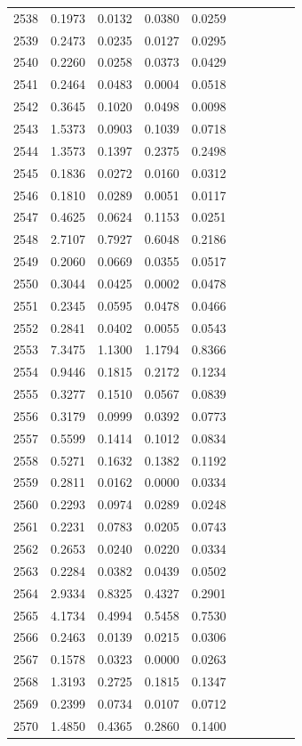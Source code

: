 \begin{table}
\begin{tabular}{cccccccccc}
2538& 0.1973& 0.0132& 0.0380& 0.0259\\ 
2539& 0.2473& 0.0235& 0.0127& 0.0295\\ 
2540& 0.2260& 0.0258& 0.0373& 0.0429\\ 
2541& 0.2464& 0.0483& 0.0004& 0.0518\\ 
2542& 0.3645& 0.1020& 0.0498& 0.0098\\ 
2543& 1.5373& 0.0903& 0.1039& 0.0718\\ 
2544& 1.3573& 0.1397& 0.2375& 0.2498\\ 
2545& 0.1836& 0.0272& 0.0160& 0.0312\\ 
2546& 0.1810& 0.0289& 0.0051& 0.0117\\ 
2547& 0.4625& 0.0624& 0.1153& 0.0251\\ 
2548& 2.7107& 0.7927& 0.6048& 0.2186\\ 
2549& 0.2060& 0.0669& 0.0355& 0.0517\\ 
2550& 0.3044& 0.0425& 0.0002& 0.0478\\ 
2551& 0.2345& 0.0595& 0.0478& 0.0466\\ 
2552& 0.2841& 0.0402& 0.0055& 0.0543\\ 
2553& 7.3475& 1.1300& 1.1794& 0.8366\\ 
2554& 0.9446& 0.1815& 0.2172& 0.1234\\ 
2555& 0.3277& 0.1510& 0.0567& 0.0839\\ 
2556& 0.3179& 0.0999& 0.0392& 0.0773\\ 
2557& 0.5599& 0.1414& 0.1012& 0.0834\\ 
2558& 0.5271& 0.1632& 0.1382& 0.1192\\ 
2559& 0.2811& 0.0162& 0.0000& 0.0334\\ 
2560& 0.2293& 0.0974& 0.0289& 0.0248\\ 
2561& 0.2231& 0.0783& 0.0205& 0.0743\\ 
2562& 0.2653& 0.0240& 0.0220& 0.0334\\ 
2563& 0.2284& 0.0382& 0.0439& 0.0502\\ 
2564& 2.9334& 0.8325& 0.4327& 0.2901\\ 
2565& 4.1734& 0.4994& 0.5458& 0.7530\\ 
2566& 0.2463& 0.0139& 0.0215& 0.0306\\ 
2567& 0.1578& 0.0323& 0.0000& 0.0263\\ 
2568& 1.3193& 0.2725& 0.1815& 0.1347\\ 
2569& 0.2399& 0.0734& 0.0107& 0.0712\\ 
2570& 1.4850& 0.4365& 0.2860& 0.1400\\ 

\end{tabular}
\end{table}
